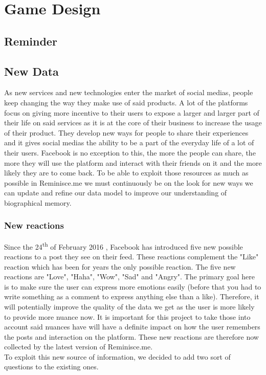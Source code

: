 \chapter{Game Design}
\section{Reminder}
\section{New Data}
As new services and new technologies enter the market of social medias, people keep changing the way they make use of said products. A lot of the platforms focus on giving more incentive to their users to expose a larger and larger part of their life on said services as it is at the core of their business to increase the usage of their product. They develop new ways for people to share their experiences and it gives social medias the ability to be a part of the everyday life of a lot of their users. Facebook is no exception to this, the more the people can share, the more they will use the platform and interact with their friends on it and the more likely they are to come back. To be able to exploit those resources as much as possible in Reminisce.me we must continuously be on the look for new ways we can update and refine our data model to improve our understanding of biographical memory.
\subsection{New reactions}
Since the 24\textsuperscript{th} of February 2016 \cite{reactrelease}, Facebook has introduced five new possible reactions to a post they see on their feed. These reactions complement the "Like" reaction which has been for years the only possible reaction. The five new reactions are "Love", "Haha", "Wow", "Sad" and "Angry". The primary goal here is to make sure the user can express more emotions easily (before that you had to write something as a comment to express anything else than  a like). Therefore, it will potentially improve the quality of the data we get as the user is more likely to provide more nuance now. It is important for this project to take those into account said nuances have will have a definite impact on how the user remembers the posts and interaction on the platform. These new reactions are therefore now collected by the latest version of Reminisce.me.\\
To exploit this new source of information, we decided to add two sort of questions to the existing ones.
